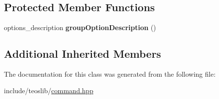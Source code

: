 \subsection*{Protected Member Functions}
\begin{DoxyCompactItemize}
\item 
\mbox{\label{classteos_1_1_command_options_ad9cb8c834296b2c5dee2a82c006bfa0c}} 
options\+\_\+description {\bfseries group\+Option\+Description} ()
\end{DoxyCompactItemize}
\subsection*{Additional Inherited Members}


The documentation for this class was generated from the following file\+:\begin{DoxyCompactItemize}
\item 
include/teoslib/\mbox{\hyperlink{command_8hpp}{command.\+hpp}}\end{DoxyCompactItemize}
